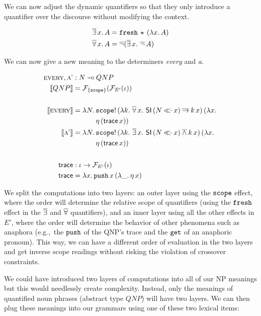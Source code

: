 We can now adjust the dynamic quantifiers so that they only introduce a
quantifier over the discourse without modifying the context.

\begin{align*}
  \mathop{\overline{\exists}} x.\,A &= \mathtt{fresh}\,\star\,(\lambda x.\, A) \\
  \mathop{\overline{\forall}} x.\,A &= \mathop{\overline{\lnot}} (\mathop{\overline{\exists}} x.\,\mathop{\overline{\lnot}} A)
\end{align*}

We can now give a new meaning to the determiners \emph{every} and \emph{a}.

\begin{align*}
  \textsc{every}, \textsc{a'} &: N \mathbin{{-}\mkern-3.5mu{\circ}} QNP \\
  \llbracket QNP \rrbracket &= \mathcal{F}_{\{\mathtt{scope}\}}(\mathcal{F}_{E'}(\iota)) \\
  \\
  \llbracket \textsc{every} \rrbracket &= \lambda N.\, \begin{aligned}[t]
      &\mathtt{scope}!\,(\lambda k.\, \mathop{\overline{\forall}} x.\ \textsf{SI}\,(N \mathbin{\ll\!\!\cdot} x) \mathbin{\overline{\to}} k\,x)\,(\lambda x.\,  \\
      &\eta\,(\textsf{trace}\,x))
    \end{aligned} \\
  \llbracket \textsc{a'} \rrbracket &= \lambda N.\, \begin{aligned}[t]
      &\mathtt{scope}!\,(\lambda k.\, \mathop{\overline{\exists}} x.\ \textsf{SI}\,(N \mathbin{\ll\!\!\cdot} x) \mathbin{\overline{\land}} k\,x)\,(\lambda x.\,  \\
      &\eta\,(\textsf{trace}\,x))
    \end{aligned} \\
  \\
  \textsf{trace} &: \iota \to \mathcal{F}_{E'}(\iota) \\
  \textsf{trace} &= \lambda x.\, \mathtt{push}\,x\,(\lambda \_.\, \eta\,x)
\end{align*}

We split the computations into two layers: an outer layer using the
$\mathtt{scope}$ effect, where the order will determine the relative scope of
quantifiers (using the $\mathtt{fresh}$ effect in the $\mathop{\overline{\exists}}$ and $\mathop{\overline{\forall}}$
quantifiers), and an inner layer using all the other effects in $E'$, where
the order will determine the behavior of other phenomena such as anaphora
(e.g.,\ the $\mathtt{push}$ of the QNP's trace and the $\mathtt{get}$ of an
anaphoric pronoun). This way, we can have a different order of evaluation
in the two layers and get inverse scope readings without risking the
violation of crossover constraints.

We could have introduced two layers of computations into all of our NP
meanings but this would needlessly create complexity. Instead, only the
meanings of quantified noun phrases (abstract type $QNP$) will have
two layers. We can then plug these meanings into our grammars using one of
these two lexical items:


